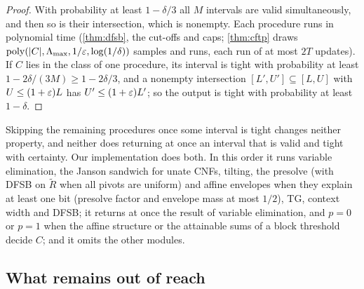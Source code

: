 \begin{proof}
With probability at least $1-\delta/3$ all $M$ intervals are valid simultaneously,
and then so is their intersection, which is nonempty. Each procedure runs in
polynomial time (\cref{thm:dfsb}, the cut-offs and caps; \cref{thm:cftp} draws
$\mathrm{poly}(|C|,\Lambda_{\max},1/\varepsilon,\log(1/\delta))$ samples and runs, each run of
at most $2T$ updates). If $C$ lies in the class of one procedure, its interval is
tight with probability at least $1-2\delta/(3M)\ge1-2\delta/3$, and a nonempty
intersection $[L',U']\subseteq[L,U]$ with $U\le(1+\varepsilon)L$ has $U'\le(1+\varepsilon)L'$; so
the output is tight with probability at least $1-\delta$.
\end{proof}

Skipping the remaining procedures once some interval is tight changes neither
property, and neither does returning at once an interval that is valid and tight
with certainty. Our implementation does both. In this order it runs variable
elimination, the Janson sandwich for unate CNFs, tilting, the presolve (with DFSB on
$\tilde R$ when all pivots are uniform) and affine envelopes when they explain at
least one bit (presolve factor and envelope mass at most $1/2$), TG, context width and
DFSB; it returns at once the result of variable elimination, and $p=0$ or $p=1$ when
the affine structure or the attainable sums of a block threshold decide $C$; and it
omits the other modules.

\subsection{What remains out of reach}\label{sec:part1-limits}

